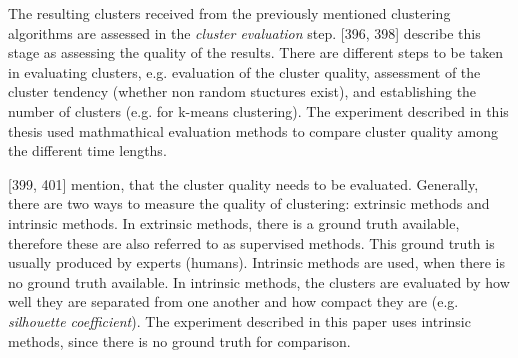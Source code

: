 The resulting clusters received from the previously mentioned clustering algorithms are assessed in the \textit{cluster evaluation} step. \textcite{han2011data}[396, 398] describe this stage as assessing the quality of the results.
There are different steps to be taken in evaluating clusters, e.g. evaluation of the cluster quality, assessment of the cluster tendency (whether non random stuctures exist), and establishing the number of clusters (e.g. for k-means clustering). The experiment described in this thesis used mathmathical evaluation methods to compare cluster quality among the different time lengths. 
 

 


  \textcite{han2011data}[399, 401] mention, that the cluster quality needs to be evaluated. Generally, there are two ways to measure the quality of clustering: extrinsic methods and intrinsic methods. In extrinsic methods, there is a ground truth available, therefore these are also referred to as supervised methods. This ground truth is usually produced by experts (humans). Intrinsic methods are used, when there is no ground truth available. In intrinsic methods, the clusters are evaluated by how well they are separated from one another and how compact they are (e.g. \textit{silhouette coefficient}).
  The experiment described in this paper uses intrinsic methods, since there is no ground truth for comparison.
  
